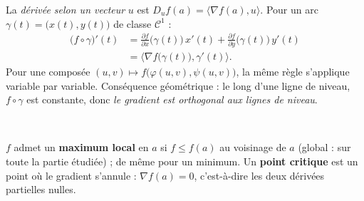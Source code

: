 
\noindent
\begin{minipage}[c]{0.55\linewidth}
\begin{theoreme}
La \emph{dérivée selon un vecteur} $u$ est
$D_uf(a)=\langle\nabla f(a),u\rangle$. Pour un arc
$\gamma(t)=\bigl(x(t),y(t)\bigr)$ de classe $\mathcal{C}^{1}$ :
\begin{align*}
\bigl(f\circ\gamma\bigr)'(t)
&=\frac{\partial f}{\partial x}\bigl(\gamma(t)\bigr)\,x'(t)
+\frac{\partial f}{\partial y}\bigl(\gamma(t)\bigr)\,y'(t)\\
&=\bigl\langle\nabla f\bigl(\gamma(t)\bigr),\gamma'(t)\bigr\rangle .
\end{align*}
Pour une composée $(u,v)\mapsto f\bigl(\varphi(u,v),\psi(u,v)\bigr)$, la
même règle s'applique variable par variable. Conséquence géométrique :
le long d'une ligne de niveau, $f\circ\gamma$ est constante, donc
\emph{le gradient est orthogonal aux lignes de niveau}.
\end{theoreme}
\end{minipage}\hfill
\begin{minipage}[c]{0.41\linewidth}
\centering
{}\\[0.5mm]
\end{minipage}


\begin{definition}
$f$ admet un \textbf{maximum local} en $a$ si $f\leqslant f(a)$ au
voisinage de $a$ (global : sur toute la partie étudiée) ; de même pour un
minimum. Un \textbf{point critique} est un point où le gradient s'annule :
$\nabla f(a)=0$, c'est-à-dire les deux dérivées partielles nulles.
\end{definition}

